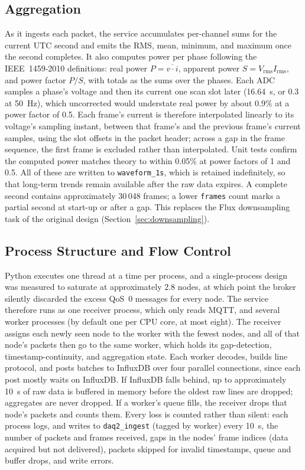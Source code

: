 \subsection{Aggregation}
As it ingests each packet, the service accumulates per-channel sums for the current UTC second and emits the RMS, mean, minimum, and maximum once the second completes. It also computes power per phase following the IEEE~1459-2010 definitions: real power $P = \overline{v \cdot i}$, apparent power $S = V_\mathrm{rms} I_\mathrm{rms}$, and power factor $P/S$, with totals as the sums over the phases. Each ADC samples a phase's voltage and then its current one scan slot later (16.64~\textmu s, or 0.3\textdegree{} at 50~Hz), which uncorrected would understate real power by about 0.9\% at a power factor of 0.5. Each frame's current is therefore interpolated linearly to its voltage's sampling instant, between that frame's and the previous frame's current samples, using the slot offsets in the packet header; across a gap in the frame sequence, the first frame is excluded rather than interpolated. Unit tests confirm the computed power matches theory to within 0.05\% at power factors of 1 and 0.5. All of these are written to \texttt{waveform\_1s}, which is retained indefinitely, so that long-term trends remain available after the raw data expires. A complete second contains approximately 30\,048 frames; a lower \texttt{frames} count marks a partial second at start-up or after a gap. This replaces the Flux downsampling task of the original design (Section~\ref{sec:downsampling}).

\subsection{Process Structure and Flow Control}
Python executes one thread at a time per process, and a single-process design was measured to saturate at approximately 2.8 nodes, at which point the broker silently discarded the excess QoS~0 messages for every node. The service therefore runs as one receiver process, which only reads MQTT, and several worker processes (by default one per CPU core, at most eight). The receiver assigns each newly seen node to the worker with the fewest nodes, and all of that node's packets then go to the same worker, which holds its gap-detection, timestamp-continuity, and aggregation state. Each worker decodes, builds line protocol, and posts batches to InfluxDB over four parallel connections, since each post mostly waits on InfluxDB. If InfluxDB falls behind, up to approximately 10~s of raw data is buffered in memory before the oldest raw lines are dropped; aggregates are never dropped. If a worker's queue fills, the receiver drops that node's packets and counts them. Every loss is counted rather than silent: each process logs, and writes to \texttt{daq2\_ingest} (tagged by worker) every 10~s, the number of packets and frames received, gaps in the nodes' frame indices (data acquired but not delivered), packets skipped for invalid timestamps, queue and buffer drops, and write errors.

